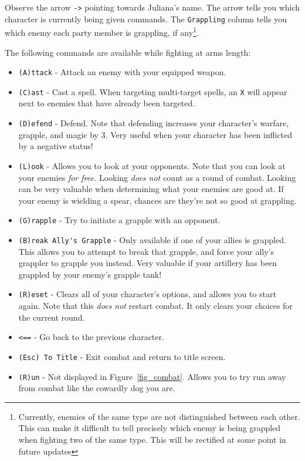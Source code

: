 \documentclass{report}
\begin{document}
\begin{itemize}
\begin{itemize}
Observe the arrow {\color{green!50!black} \texttt{->}} pointing towards Juliana's name. The arrow tells you which character is currently being given commands. 
The \verb|Grappling| column tells you which enemy each party member is grappling, if any\footnote{Currently, enemies of the same type are not distinguished between each
other. This
can make it difficult to tell precisely which enemy is being grappled when fighting two of the same type. This will be rectified at some point in future updates}.

The following commands are available while fighting at arms length:
\begin{itemize}
    \item \verb|(A)ttack| - Attack an enemy with your equipped weapon.
    \item \verb|(C)ast| - Cast a spell. When targeting multi-target spells, an \verb|X| will appear next to enemies that have
    already been targeted.
    \item \verb|(D)efend| - Defend. Note that defending increases your character's
    warfare, grapple, and magic by 3. Very useful when your character has been
    inflicted by a negative status!
    \item \verb|(L)ook| - Allows you to look at your opponents. Note that you can
    look at your enemies \emph{for free.} Looking \emph{does not} count as a round
    of combat. Looking can be very valuable when determining what your enemies are
    good at. If your enemy is wielding a spear, chances are they're not so good
    at grappling.
    \item \verb|(G)rapple| - Try to initiate a grapple with an opponent.
    \item \verb|(B)reak Ally's Grapple| - Only available if one of your allies is grappled.
    This allows you to attempt to break that grapple, and force your ally's grappler
    to grapple you instead. Very valuable if your artillery has been 
    grappled by your enemy's grapple tank!
    \item \verb|(R)eset| - Clears all of your character's options, and allows you
    to start again. Note that this \emph{does not} restart combat. It only 
    clears your choices for the current round.
    \item {\color{green!50!black} \texttt{<==}} - Go back to the previous 
        character.
    \item \verb|(Esc) To Title| - Exit combat and return to title screen.
    \item \verb|(R)un| - Not displayed in Figure~\ref{fig_combat}. Allows you
        to try run away from combat like the cowardly dog you are.
\end{itemize}


\end{itemize}
\end{itemize}
\end{document}
